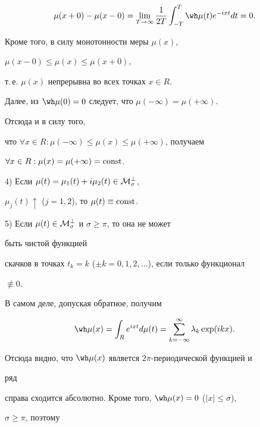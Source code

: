 $$ 


\mu(x+0)-\mu(x-0)=\lim_{T\to\infty}\frac{1}{2T} 


\int^T_{-T}\wh\mu(t)e^{-ixt}dt=0. 


$$ 


 


Кроме того, в силу монотонности меры $\mu(x)$, 


$\mu(x-0)\le\mu(x)\le\mu(x+0)$, 


т.\,е. $\mu(x)$ непрерывна во всех точках $x\in R$. 


 


Далее, из $\wh\mu(0)=0$ следует, что $\mu(-\infty)=\mu(+\infty)$. 


Отсюда и в силу того, 


что $\forall x\in R:\mu(-\infty)\le\mu(x)\le\mu(+\infty)$, получаем 


$\forall x\in R:\mu(x)=\mu(+\infty)=\operatorname{const}$. 


 


4) Если $\mu(t)=\mu_1(t)+i\mu_2(t)\in\cal M^\bot_\sigma$, 


$\mu_j(t)\uparrow$ ($j=1,2$), то $\mu(t)\equiv\operatorname{const}$. 


 


5) Если $\mu(t)\in\cal M^\bot_\sigma$ и $\sigma\ge\pi$, то она не может 


быть чистой функцией 


скачков в точках $t_k=k$ ($\pm k=0,1,2,\dotsc$), если только функционал 


$\not\equiv0$. 


 


В самом деле, допуская обратное, получим 


$$ 


\wh\mu(x)=\int_R e^{ixt}d\mu(t)=\sum^\infty_{k=-\infty} 


\lambda_k\exp(ikx). 


$$ 


 


Отсюда видно, что $\wh\mu(x)$ является $2\pi$-периодической функцией и 


ряд 


справа сходится абсолютно. Кроме того, $\wh\mu(x)=0$ ($|x|\le\sigma$), 


$\sigma\ge\pi$, поэтому 


